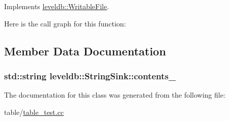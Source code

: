 Implements \hyperlink{classleveldb_1_1_writable_file_a2d2dcef02a2c9e71f3d39125bcd5a606}{leveldb\-::\-Writable\-File}.



Here is the call graph for this function\-:




\subsection{Member Data Documentation}
\hypertarget{classleveldb_1_1_string_sink_a1d0cf9c939de3e41d9c45df09297d1f3}{
\subsubsection[{contents\-\_\-}]{\setlength{\rightskip}{0pt plus 5cm}std\-::string leveldb\-::\-String\-Sink\-::contents\-\_\-\hspace{0.3cm}{\ttfamily [private]}}}\label{classleveldb_1_1_string_sink_a1d0cf9c939de3e41d9c45df09297d1f3}


The documentation for this class was generated from the following file\-:\begin{DoxyCompactItemize}
\item 
table/\hyperlink{table__test_8cc}{table\-\_\-test.\-cc}\end{DoxyCompactItemize}
